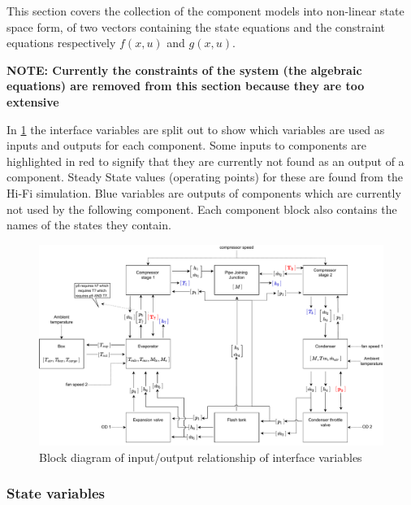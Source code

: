 This section covers the collection of the component models into non-linear state space form, of two vectors containing the state equations and the constraint equations respectively $f(x,u)$ and $ g(x,u) $.

\textbf{NOTE: Currently the constraints of the system (the algebraic equations) are removed from this section because they are too extensive}


In \cref{fig:Block_diagram_inout} the interface variables are split out to show which variables are used as inputs and outputs for each component. Some inputs to components are highlighted in red to signify that they are currently not found as an output of a component. Steady State values (operating points) for these are found from the Hi-Fi simulation. Blue variables are outputs of components which are currently not used by the following component. Each component block also contains the names of the states they contain.

\begin{figure}[h!]
	\centering
	\includegraphics[width=1\textwidth]{Graphics/Block_Diagram_inout.pdf}
	\caption{Block diagram of input/output relationship of interface variables}
	\label{fig:Block_diagram_inout}
\end{figure}


\newpage
\subsubsection{State variables}

